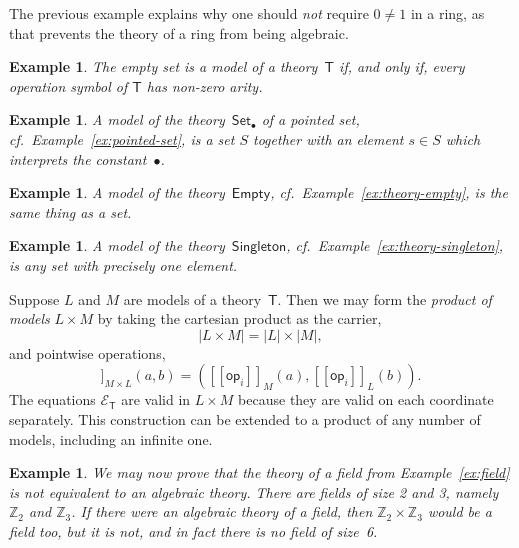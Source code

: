 \documentclass{amsart}
\newcommand{\ZZ}{\mathbb{Z}} %
\newcommand{\theory}[1]{\mathsf{#1}} %
\newcommand{\equations}[1]{\mathcal{E}_{\theory{#1}}} %
\newcommand{\carrier}[1]{|#1|} %
\newcommand{\op}[1]{\mathsf{op}_{#1}} %
\newcommand{\sem}[1]{[\![#1]\!]} %
\newtheorem{example}[definition]{Example}
\begin{document}
The previous example explains why one should \emph{not} require $0 \neq 1$ in a ring, as
that prevents the theory of a ring from being algebraic.

\begin{example}
  The empty set is a model of a theory~$\theory{T}$ if, and only if, every operation symbol
  of $\theory{T}$ has non-zero arity.
\end{example}

\begin{example}
  A model of the theory~$\theory{Set_\bullet}$ of a pointed set, cf.\
  Example~\ref{ex:pointed-set}, is a set $S$ together with an element $s \in S$ which
  interprets the constant~$\bullet$.
\end{example}

\begin{example}
  A model of the theory~$\theory{Empty}$, cf.\ Example~\ref{ex:theory-empty}, is the same
  thing as a set.
\end{example}

\begin{example}
  A model of the theory~$\theory{Singleton}$, cf.\ Example~\ref{ex:theory-singleton}, is
  any set with precisely one element.
\end{example}

Suppose $L$ and $M$ are models of a theory~$\theory{T}$. Then we may form the
\emph{product of models} $L \times M$ by taking the cartesian product as the carrier,
%
\begin{equation*}
  \carrier{L \times M} = \carrier{L} \times \carrier{M},
\end{equation*}
%
and pointwise operations,
%
\begin{equation*}
  \sem{\op{i}}_{M \times L}(a, b) = (\sem{\op{i}}_M(a), \sem{\op{i}}_L(b)).
\end{equation*}
%
The equations $\equations{T}$ are valid in $L \times M$ because they are valid on each
coordinate separately. This construction can be extended to a product of any number of
models, including an infinite one.

\begin{example}
  We may now prove that the theory of a field from Example~\ref{ex:field} is not
  equivalent to an algebraic theory. There are fields of size 2 and 3, namely $\ZZ_2$ and
  $\ZZ_3$. If there were an algebraic theory of a field, then $\ZZ_2 \times \ZZ_3$ would
  be a field too, but it is not, and in fact there is no field of size~6.
\end{example}
\end{document}
